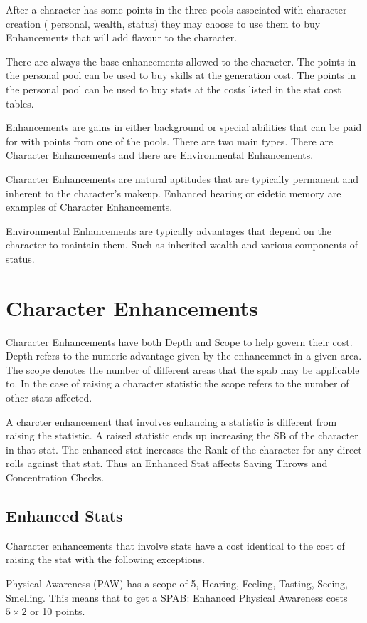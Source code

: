 After a character has some points in the three pools associated with
character creation ( personal, wealth, status) they may choose to
use them to buy Enhancements that will add flavour to the character.

There are always the base enhancements allowed to the character. The
points in the personal pool can be used to buy skills at the generation
cost. The points in the personal pool can be used to buy stats at the costs
listed in the stat cost tables.

Enhancements are gains in either background or special abilities that
can be paid for with points from one of the pools. There are two main
types. There are Character Enhancements and there are
Environmental Enhancements.

Character Enhancements are natural aptitudes that are typically 
permanent and inherent to the character's makeup. Enhanced hearing or
eidetic memory are examples of Character Enhancements.

Environmental Enhancements are typically advantages that depend on  the
character to maintain them. Such as inherited wealth and various components 
of status.

\section{Character Enhancements}

Character Enhancements have both Depth and Scope to help govern their cost.
Depth refers to the numeric advantage given by the enhancemnet in a given
area. The scope denotes the number of different areas that the spab
may be applicable to. In the case of raising a character statistic the 
scope refers to the number of other stats affected.

A charcter enhancement that involves enhancing a statistic is different from 
raising the statistic. A raised statistic ends up increasing the SB of the 
character in that stat. The enhanced stat increases the Rank of the 
character for any direct rolls against that stat. Thus an Enhanced Stat
affects Saving Throws and Concentration Checks.

\subsection{Enhanced Stats}
Character enhancements that involve stats have a cost identical to the 
cost of raising the stat with the following exceptions.

Physical Awareness (PAW) has a scope of 5, Hearing, Feeling, Tasting,
Seeing, Smelling. This means that to get a SPAB: Enhanced Physical
Awareness costs \( 5 \times 2 \) or 10 points.

